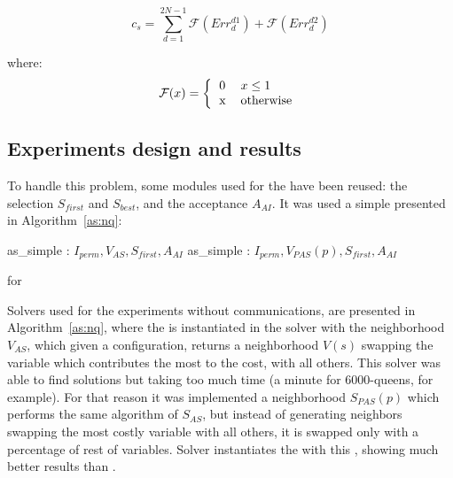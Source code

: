 \begin{equation}\label{func:cost_nqp}
c_s=\sum_{d=1}^{2N-1}{\mathcal{F}(Err^{d1}_{d}) + \mathcal{F}(Err^{d2}_{d})}
\end{equation}

where:
\begin{equation*}
\mathcal{F}(x)=\left\{
\begin{tabular}{ll}
0 & $x \leq 1$ \\
x & otherwise
\end{tabular}
\right.
\end{equation*}

\subsection{Experiments design and results}

To handle this problem, some modules used for the \sgp{} have been reused: the selection \oms{} $S_{first}$ and $S_{best}$, and the acceptance \om{} $A_{AI}$. It was used a simple \as{} presented in Algorithm~\ref{as:nq}:

\begin{algorithm}[H]
\dontprintsemicolon
\SetNoline
{}
   as\_simple\;
\algoindent {} : $I_{perm}, V_{AS}, S_{first}, A_{AI}$ \;
   as\_simple\;
\algoindent {} : $I_{perm}, V_{PAS}(p), S_{first}, A_{AI}$ \; 
\caption{\As{} for \NQP}\label{as:nq}
\end{algorithm}

Solvers used for the experiments without communications, are presented in Algorithm~\ref{as:nq}, where the \as{} is instantiated in the solver  with the neighborhood \om{} $V_{AS}$, which given a configuration, returns a neighborhood $V\left(s\right)$ swapping the variable which contributes the most to the cost, with all others. This solver was able to find solutions but taking too much time (a minute for 6000-queens, for example). For that reason it was implemented a neighborhood \om{} $S_{PAS}(p)$ which performs the same algorithm of $S_{AS}$, but instead of generating neighbors swapping the most costly variable with all others, it is swapped only with a percentage of rest of variables. Solver  instantiates the \as{} with this \om, showing much better results than .

